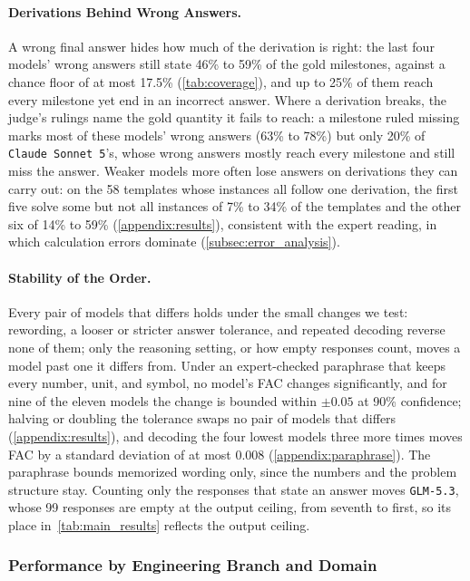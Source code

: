 \paragraph{Derivations Behind Wrong Answers.} A wrong final answer hides how much of the derivation
is right: the last four models' wrong answers still state 46\% to 59\% of the gold milestones,
against a chance floor of at most 17.5\% (\autoref{tab:coverage}), and up to 25\% of them reach
every milestone yet end in an incorrect answer.
Where a derivation breaks, the judge's rulings name the gold quantity it fails to reach: a milestone
ruled missing marks most of these models' wrong answers (63\% to 78\%) but only 20\% of
\texttt{Claude Sonnet 5}'s, whose wrong answers mostly reach every milestone and still miss the
answer.
Weaker models more often lose answers on derivations they can carry out: on the 58 templates whose
instances all follow one derivation, the first five solve some but not all instances of 7\% to 34\%
of the templates and the other six of 14\% to 59\% (\autoref{appendix:results}), consistent with
the expert reading, in which calculation errors dominate (\autoref{subsec:error_analysis}).

\paragraph{Stability of the Order.} Every pair of models that differs holds under the small changes
we test: rewording, a looser or stricter answer tolerance, and repeated decoding reverse none of
them; only the reasoning setting, or how empty responses count, moves a model past one it differs
from.
Under an expert-checked paraphrase that keeps every number, unit, and symbol, no model's FAC
changes significantly, and for nine of the eleven models the change is bounded within $\pm 0.05$
at 90\% confidence; halving or doubling the tolerance swaps no pair of models that differs
(\autoref{appendix:results}), and decoding the four lowest models three more times moves FAC by a
standard deviation of at most 0.008 (\autoref{appendix:paraphrase}).
The paraphrase bounds memorized wording only, since the numbers and the problem structure stay.
Counting only the responses that state an answer moves \texttt{GLM-5.3}, whose 99 responses are
empty at the output ceiling, from seventh to first, so its place in~\autoref{tab:main_results}
reflects the output ceiling.

\subsubsection{Performance by Engineering Branch and Domain}
\label{subsec:branch_domain}

